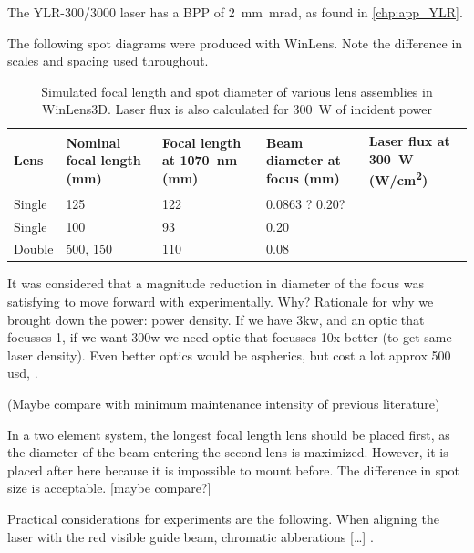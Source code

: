         The YLR-300/3000 laser has a BPP of \qty{2}{mm.mrad}, as found in \autoref{chp:app_YLR}.

        The following spot diagrams were produced with WinLens. Note the difference in scales and spacing used throughout.



        \begin{table}[!ht]
            \centering
            \caption{Simulated focal length and spot diameter of various lens assemblies in WinLens3D. Laser flux is also calculated for \qty{300}{W} of incident power}
            \label{tab:laser flux}
            \begin{tabularx}{\textwidth}{@{}lX<{\raggedright}X<{\raggedright}X<{\raggedright}X<{\raggedright}@{}}
            \toprule
            Lens & Nominal focal length (\unit{mm}) & Focal length at \qty{1070}{nm} (\unit{mm})& Beam diameter at focus (\unit{mm}) & Laser flux at \qty{300}{W} (\unit{W/cm^2}) \\ \midrule
            Single & 125           &  122   &    0.0863 ?  0.20?     &  \\
            Single & 100           &  93   &    0.20   &  \\
            Double & 500, 150      &  110    &    0.08   &  \\
            \bottomrule
            \end{tabularx}
        \end{table}

        It was considered that a magnitude reduction in diameter of the focus was satisfying to move forward with experimentally. Why? Rationale for why we brought down the power: power density. If we have 3kw, and an optic that focusses 1, if we want 300w we need optic that focusses 10x better (to get same laser density). Even better optics would be aspherics, but cost a lot approx 500 usd, .

        (Maybe compare with minimum maintenance intensity of previous literature)

        In a two element system, the longest focal length lens should be placed first, as the diameter of the beam entering the second lens is maximized. However, it is placed after here because it is impossible to mount before. The difference in spot size is acceptable. [maybe compare?]

        Practical considerations for experiments are the following. When aligning the laser with the red visible guide beam, chromatic abberations [\dots] \cite{hechtUnderstandingLasersEntry2019}.

